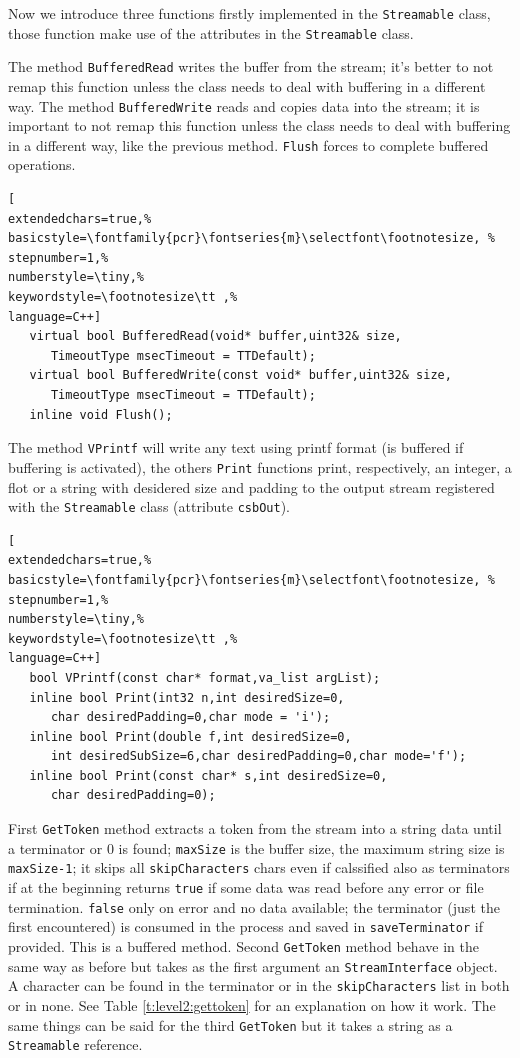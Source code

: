 Now we introduce three functions firstly implemented in the \texttt{Streamable} class, those function make use of the attributes in the \texttt{Streamable} class.

The method \texttt{BufferedRead} writes the buffer from the stream; it's better to not remap this function unless the class needs to deal with buffering in a different way.
The method \texttt{BufferedWrite} reads and copies data into the stream; it is important to not remap this function unless the class needs to deal with buffering in a different way, like the previous method. \texttt{Flush} forces to complete buffered operations.
\begin{lstlisting}[
extendedchars=true,%
basicstyle=\fontfamily{pcr}\fontseries{m}\selectfont\footnotesize, %
stepnumber=1,%
numberstyle=\tiny,%
keywordstyle=\footnotesize\tt ,%
language=C++]
   virtual bool BufferedRead(void* buffer,uint32& size,
      TimeoutType msecTimeout = TTDefault);
   virtual bool BufferedWrite(const void* buffer,uint32& size,
      TimeoutType msecTimeout = TTDefault);
   inline void Flush();
\end{lstlisting}

The method \texttt{VPrintf} will write any text using printf format (is buffered if buffering is activated), the others \texttt{Print} functions print, respectively, an integer, a flot or a string with desidered size and padding to the output stream registered with the \texttt{Streamable} class (attribute \texttt{csbOut}).
\begin{lstlisting}[
extendedchars=true,%
basicstyle=\fontfamily{pcr}\fontseries{m}\selectfont\footnotesize, %
stepnumber=1,%
numberstyle=\tiny,%
keywordstyle=\footnotesize\tt ,%
language=C++]
   bool VPrintf(const char* format,va_list argList);
   inline bool Print(int32 n,int desiredSize=0,
      char desiredPadding=0,char mode = 'i');
   inline bool Print(double f,int desiredSize=0,
      int desiredSubSize=6,char desiredPadding=0,char mode='f');
   inline bool Print(const char* s,int desiredSize=0,
      char desiredPadding=0);
\end{lstlisting}


First \texttt{GetToken} method extracts a token from the stream into a string data until a terminator or 0 is found; \texttt{maxSize} is the buffer size, the maximum string size is \texttt{maxSize-1}; it skips all \texttt{skipCharacters} chars even if calssified also as terminators if at the beginning returns \texttt{true} if some data was read before any error or file termination. \texttt{false} only on error and no data available; the terminator (just the first encountered) is consumed in the process and saved in \texttt{saveTerminator} if provided. This is a buffered method.
Second \texttt{GetToken} method behave in the same way as before but takes as the first argument an \texttt{StreamInterface} object. A character can be found in the terminator or in the \texttt{skipCharacters} list in both or in none. See Table \ref{t:level2:gettoken} for an explanation on how it work. The same things can be said for the third \texttt{GetToken} but it takes a string as a \texttt{Streamable} reference.

